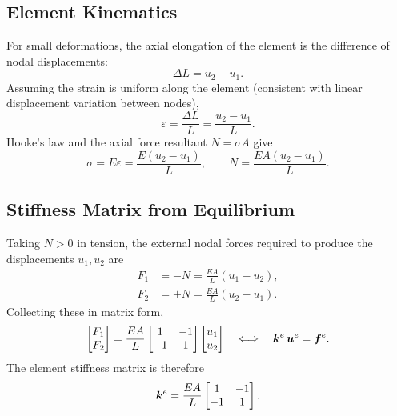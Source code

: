 \subsection{Element Kinematics}

For small deformations, the axial elongation of the element is the difference
of nodal displacements:
\begin{equation}
    \Delta L = u_2 - u_1 .
    \label{eq:bar_elongation}
\end{equation}
Assuming the strain is uniform along the element (consistent with linear
displacement variation between nodes),
\begin{equation}
    \varepsilon = \frac{\Delta L}{L} = \frac{u_2 - u_1}{L} .
    \label{eq:bar_strain_direct}
\end{equation}
Hooke's law and the axial force resultant $N = \sigma A$ give
\begin{equation}
    \sigma = E\varepsilon = \frac{E(u_2-u_1)}{L},
    \qquad
    N = \frac{EA(u_2-u_1)}{L} .
    \label{eq:bar_axial_force_direct}
\end{equation}

\subsection{Stiffness Matrix from Equilibrium}

Taking $N>0$ in tension, the external nodal forces required to produce the
displacements $u_1, u_2$ are
\begin{align}
    F_1 &= -N = \frac{EA}{L}(u_1 - u_2),
    \label{eq:bar_F1_direct} \\
    F_2 &= +N = \frac{EA}{L}(u_2 - u_1) .
    \label{eq:bar_F2_direct}
\end{align}
Collecting these in matrix form,
\begin{equation}
    \begin{bmatrix} F_1 \\ F_2 \end{bmatrix}
    = \frac{EA}{L}
    \begin{bmatrix} 1 & -1 \\ -1 & 1 \end{bmatrix}
    \begin{bmatrix} u_1 \\ u_2 \end{bmatrix}
    \quad\Longleftrightarrow\quad
    \bm{k}^e\,\bm{u}^e = \bm{f}^e .
\end{equation}
The element stiffness matrix is therefore
\begin{equation}
    \bm{k}^e = \frac{EA}{L}\begin{bmatrix} 1 & -1 \\ -1 & 1 \end{bmatrix} .
    \label{eq:bar_stiffness}
\end{equation}

